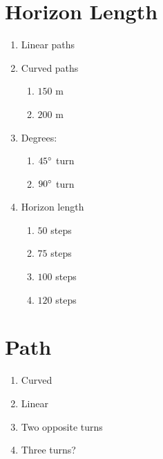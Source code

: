 \section{Horizon Length}

\begin{enumerate}
	\item Linear paths
	\item Curved paths
	\begin{enumerate}
		\item $150$ m
		\item $200$ m
	\end{enumerate}
	\item Degrees:
	\begin{enumerate}
		\item $45 \degree$ turn
		\item $90 \degree$ turn
	\end{enumerate}
	\item Horizon length
	\begin{enumerate}
		\item $50$ steps
		\item $75$ steps
		\item $100$ steps
		\item $120$ steps
	\end{enumerate}
\end{enumerate}

\section{Path}

\begin{enumerate}
	\item Curved
	\item Linear
	\item Two opposite turns
	\item Three turns?
\end{enumerate}


